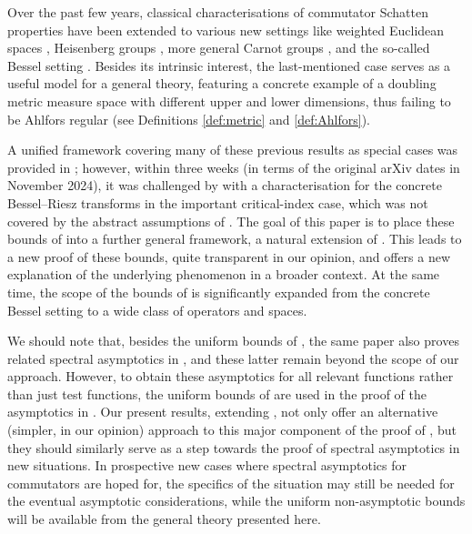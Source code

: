 \documentclass[reqno]{amsart}
\theoremstyle{plain}
\theoremstyle{definition}
\theoremstyle{remark}
\begin{document}
Over the past few years, classical characterisations \cite{JW:82,RS:NWO} of commutator Schatten properties have been extended to various new settings like weighted Euclidean spaces \cite{GLW:23},
Heisenberg groups \cite{FLL:23,FLMSZ}, more general Carnot groups \cite{LXY},
and the so-called Bessel setting \cite{FLLX}. Besides its intrinsic interest, the last-mentioned case serves as a useful model for a general theory, featuring a concrete example of a doubling metric measure space with different upper and lower dimensions, thus failing to be Ahlfors regular (see Definitions \ref{def:metric} and \ref{def:Ahlfors}).

A unified framework covering many of these previous results as special cases was provided in \cite{Hyt:Sp}; however, within three weeks (in terms of the original arXiv dates in November 2024), it was challenged by \cite{FLSZ} with a characterisation for the concrete Bessel--Riesz transforms in the important critical-index case, which was not covered by the abstract assumptions of \cite{Hyt:Sp}. The goal of this paper is to place these bounds of \cite{FLSZ} into a further general framework, a natural extension of \cite{Hyt:Sp}. This leads to a new proof of these bounds, quite transparent in our opinion, and offers a new explanation of the underlying phenomenon in a broader context. At the same time, the scope of the bounds of \cite{FLSZ} is significantly expanded from the concrete Bessel setting to a wide class of operators and spaces.

We should note that, besides the uniform bounds of \cite[Theorem 1.2]{FLSZ}, the same paper also proves related spectral asymptotics in \cite[Theorem 1.3]{FLSZ}, and these latter remain beyond the scope of our approach. However, to obtain these asymptotics for all relevant functions rather than just test functions, the uniform bounds of \cite[Theorem 1.2]{FLSZ} are used in the proof of the asymptotics in \cite[Theorem 1.3]{FLSZ}. Our present results, extending \cite[Theorem 1.2]{FLSZ}, not only offer an alternative (simpler, in our opinion) approach to this major component of the proof of \cite[Theorem 1.3]{FLSZ}, but they should similarly serve as a step towards the proof of spectral asymptotics in new situations. In prospective new cases where spectral asymptotics for commutators are hoped for, the specifics of the situation may still be needed for the eventual asymptotic considerations, while the uniform non-asymptotic bounds will be available from the general theory presented here.
\end{document}
